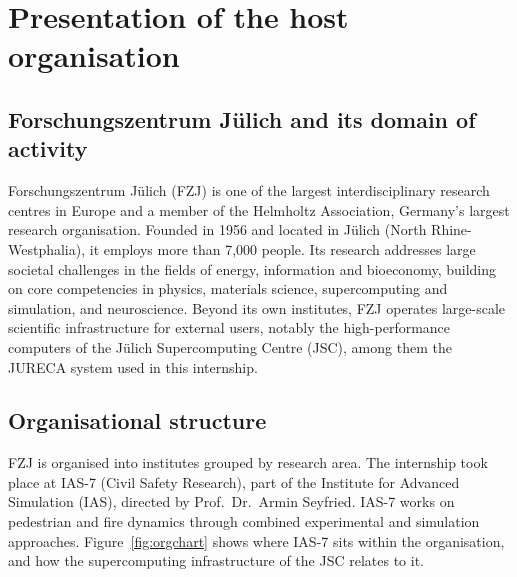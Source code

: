 \section{Presentation of the host organisation}
\label{sec:host}

\subsection{Forschungszentrum J\"ulich and its domain of activity}

Forschungszentrum J\"ulich (FZJ) is one of the largest interdisciplinary
research centres in Europe and a member of the Helmholtz Association,
Germany's largest research organisation. Founded in 1956 and located in
J\"ulich (North Rhine-Westphalia), it employs more than 7{,}000 people. Its
research addresses large societal challenges in the fields of energy,
information and bioeconomy, building on core competencies in physics,
materials science, supercomputing and simulation, and neuroscience. Beyond
its own institutes, FZJ operates large-scale scientific infrastructure for
external users, notably the high-performance computers of the J\"ulich
Supercomputing Centre (JSC), among them the JURECA system used in this
internship.

\subsection{Organisational structure}

FZJ is organised into institutes grouped by research area. The internship took
place at IAS-7 (Civil Safety Research), part of the Institute for Advanced
Simulation (IAS), directed by Prof.\ Dr.\ Armin Seyfried. IAS-7 works on
pedestrian and fire dynamics through combined experimental and simulation
approaches. Figure~\ref{fig:orgchart} shows where IAS-7 sits within the
organisation, and how the supercomputing infrastructure of the JSC relates to
it.

